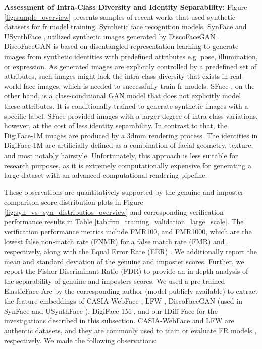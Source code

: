 \documentclass[10pt,twocolumn,letterpaper]{article}
\newcommand{\approachname}{IDiff-Face }
\begin{document}
\textbf{Assessment of Intra-Class Diversity and Identity Separability:} Figure \ref{fig:sample_overview} presents samples of recent works that used synthetic datasets for \acrshort{fr} model training.
Synthetic face recognition models, SynFace \cite{Qiu2021} and USynthFace \cite{FBoutros2022USynthFace}, utilized synthetic images generated by DiscoFaceGAN \cite{Deng2020}. DiscoFaceGAN is based on disentangled representation learning to generate images from synthetic identities with predefined attributes e.g. pose, illumination, or expression. 
As generated images are explicitly controlled by a predefined set of attributes, such images might lack the intra-class diversity that exists in real-world face images, which is needed to successfully train \acrshort{fr} models. 
SFace \cite{Boutros2022SFace}, on the other hand, is a class-conditional GAN model that does not explicitly model these attributes. It is conditionally trained to generate synthetic images with a specific label. SFace provided images with a larger degree of intra-class variations, however, at the cost of less identity separability. 
In contrast to that, the DigiFace-1M \cite{DigiFace1M} images are produced by a \acrshort{3dmm} rendering process. The identities in DigiFace-1M are artificially defined as a combination of facial geometry, texture, and most notably hairstyle. Unfortunately, this approach is less suitable for research purposes, as it is extremely computationally expensive for generating a large dataset with an advanced computational rendering pipeline. 


These observations are quantitatively supported by the genuine and imposter comparison score distribution plots in Figure \ref{fig:syn_vs_syn_distributios_overview} and corresponding verification performance results in Table \ref{tab:frm_training_validation_large_scale}.
The verification performance metrics include FMR100, and FMR1000, which are the lowest false non-match rate (FNMR) for a false match rate (FMR) and , respectively, along with the Equal Error Rate (EER) \cite{iso_metric}. We additionally report the mean and standard deviation of the genuine and imposter scores. Further, we report the Fisher Discriminant Ratio (FDR) \cite{poh2004study} to provide an in-depth analysis of the separability of genuine and imposters scores. We used a pre-trained ElasticFace-Arc \cite{ElasticFace} by the corresponding author (model publicly available) to extract the feature embeddings of CASIA-WebFace \cite{Yi2014}, LFW \cite{LFWDatabase}, DiscoFaceGAN \cite{Deng2020} (used in SynFace \cite{Qiu2021} and USynthFace \cite{FBoutros2022USynthFace}), DigiFace-1M \cite{DigiFace1M}, and our \approachname for the investigations described in this subsection. CASIA-WebFace \cite{Yi2014} and LFW \cite{LFWDatabase} are authentic datasets, and they are commonly used to train or evaluate FR models \cite{ArcFace,ElasticFace}, respectively. We made the following observations:
\end{document}
